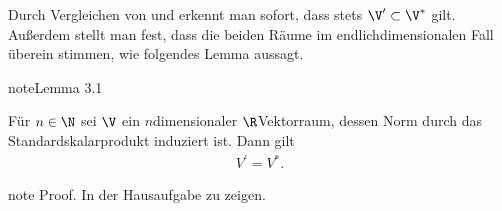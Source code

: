 \documentclass[letterpaper,10pt,german]{jupyterBook}
\begin{document}
\sphinxAtStartPar
Durch Vergleichen von {\hyperref[\detokenize{vektoranalysis/multilinear:def:algebraischerDualraum}]{}} und {\hyperref[\detokenize{vektoranalysis/multilinear:def:topologischerDualraum}]{}} erkennt man sofort, dass stets \(\V^\prime\subset \V^\ast\) gilt.
Außerdem stellt man fest, dass die beiden Räume im endlich\sphinxhyphen{}dimensionalen Fall überein stimmen, wie folgendes Lemma aussagt.
\label{vektoranalysis/multilinear:lemma-4}
\begin{sphinxadmonition}{note}{Lemma 3.1}



\sphinxAtStartPar
Für \(n\in\N\) sei \(\V\) ein \(n\)\sphinxhyphen{}dimensionaler \(\R\)\sphinxhyphen{}Vektorraum, dessen Norm durch das Standardskalarprodukt induziert ist.
Dann gilt
\begin{equation*}
\begin{split}V^\prime = V^\ast.\end{split}
\end{equation*}\end{sphinxadmonition}

\begin{sphinxadmonition}{note}
\sphinxAtStartPar
Proof. In der Hausaufgabe zu zeigen.
\end{sphinxadmonition}
\end{document}

